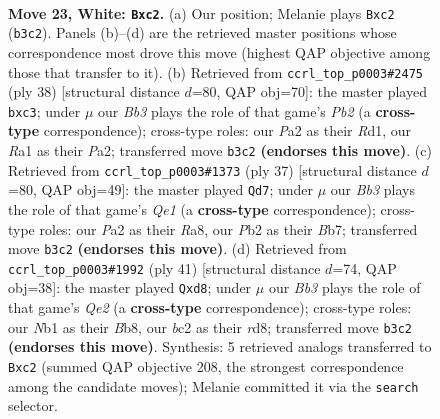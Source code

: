 \documentclass[11pt]{article}
\begin{document}
\clearpage

\begin{figure}[p]\centering
\begin{subfigure}{0.46\textwidth}\centering
\resizebox{\linewidth}{!}{%
\newchessgame
\chessboard[
  setfen={r5k1/pp3pb1/1nn2qp1/3p3p/3P4/1B4BP/PPb2PP1/RN2Q1K1 w - - 0 23},
  showmover=false,
  pgfstyle=straightmove, color=movearrow, markmove={b3-c2}
]}
\caption{}
\end{subfigure}\hfill
\begin{subfigure}{0.46\textwidth}\centering
\resizebox{\linewidth}{!}{%
\newchessgame
\chessboard[
  setfen={r3q1k1/pp1b1pp1/5n1p/3p4/2nN1B2/2bB3P/PPP2PP1/2QR2K1 w - - 0 20},
  showmover=false,
  pgfstyle=straightmove, color=movearrow, markmove={b2-c3}
]}
\caption{}
\end{subfigure}
\\[4pt]
\begin{subfigure}{0.46\textwidth}\centering
\resizebox{\linewidth}{!}{%
\newchessgame
\chessboard[
  setfen={r3q1k1/1bp2p2/5bp1/1p1n3p/p2PQ3/N1P5/PPBB1PPP/R5K1 b - - 1 19},
  showmover=false,
  pgfstyle=straightmove, color=movearrow, markmove={e8-d7}
]}
\caption{}
\end{subfigure}\hfill
\begin{subfigure}{0.46\textwidth}\centering
\resizebox{\linewidth}{!}{%
\newchessgame
\chessboard[
  setfen={rb1R1nk1/1b2q1p1/p3p2p/1p6/2p1N3/P3PN1P/1PQ2PP1/1B2R1K1 b - - 0 21},
  showmover=false,
  pgfstyle=straightmove, color=movearrow, markmove={e7-d8}
]}
\caption{}
\end{subfigure}
\caption{\textbf{Move 23, White: \texttt{Bxc2}.} (a) Our position; Melanie plays \texttt{Bxc2} (\texttt{b3c2}). Panels (b)--(d) are the retrieved master positions whose correspondence most drove this move (highest QAP objective among those that transfer to it). (b) Retrieved from \texttt{ccrl\_top\_p0003\#2475} (ply 38) [structural distance $d$=80, QAP obj=70]: the master played \texttt{bxc3}; under $\mu$ our \emph{Bb3} plays the role of that game's \emph{Pb2} (a \textbf{cross-type} correspondence); cross-type roles: our \emph{P}a2 as their \emph{R}d1, our \emph{R}a1 as their \emph{P}a2; transferred move \texttt{b3c2} \textbf{(endorses this move)}. (c) Retrieved from \texttt{ccrl\_top\_p0003\#1373} (ply 37) [structural distance $d$=80, QAP obj=49]: the master played \texttt{Qd7}; under $\mu$ our \emph{Bb3} plays the role of that game's \emph{Qe1} (a \textbf{cross-type} correspondence); cross-type roles: our \emph{P}a2 as their \emph{R}a8, our \emph{P}b2 as their \emph{B}b7; transferred move \texttt{b3c2} \textbf{(endorses this move)}. (d) Retrieved from \texttt{ccrl\_top\_p0003\#1992} (ply 41) [structural distance $d$=74, QAP obj=38]: the master played \texttt{Qxd8}; under $\mu$ our \emph{Bb3} plays the role of that game's \emph{Qe2} (a \textbf{cross-type} correspondence); cross-type roles: our \emph{N}b1 as their \emph{B}b8, our \emph{b}c2 as their \emph{r}d8; transferred move \texttt{b3c2} \textbf{(endorses this move)}. Synthesis: 5 retrieved analogs transferred to \texttt{Bxc2} (summed QAP objective 208, the strongest correspondence among the candidate moves); Melanie committed it via the \texttt{search} selector.}
\label{fig:thought-m44}
\end{figure}
\end{document}
